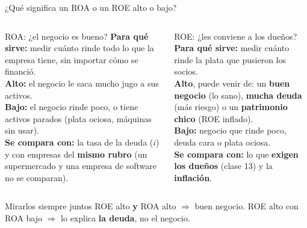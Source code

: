 \documentclass[aspectratio=169,10pt]{beamer}
\begin{document}
\begin{frame}{¿Qué significa un ROA o un ROE alto o bajo?}

\small
\begin{columns}[T]
\begin{block}{ROA: ¿el negocio es bueno?}
\textbf{Para qué sirve:} medir cuánto rinde todo lo que la empresa tiene, sin importar cómo se financió.\\[3pt]
\textbf{Alto:} el negocio le saca mucho jugo a sus activos.\\[3pt]
\textbf{Bajo:} el negocio rinde poco, o tiene activos parados (plata ociosa, máquinas sin usar).\\[3pt]
\textbf{Se compara con:} la tasa de la deuda ($i$) y con empresas del \textbf{mismo rubro}
(un supermercado y una empresa de software no se comparan).
\end{block}

\begin{block}{ROE: ¿les conviene a los dueños?}
\textbf{Para qué sirve:} medir cuánto rinde la plata que pusieron los socios.\\[3pt]
\textbf{Alto}, puede venir de: un \textbf{buen negocio} (lo sano), \textbf{mucha deuda} (más riesgo)
o un \textbf{patrimonio chico} (ROE inflado).\\[3pt]
\textbf{Bajo:} negocio que rinde poco, deuda cara o plata ociosa.\\[3pt]
\textbf{Se compara con:} lo que \textbf{exigen los dueños} (clase 13) y la \textbf{inflación}.
\end{block}
\end{columns}

\vspace{0.2cm}
\begin{alertblock}{Mirarlos siempre juntos}
ROE alto \textbf{y} ROA alto $\Rightarrow$ buen negocio. \quad
ROE alto con ROA bajo $\Rightarrow$ lo explica \textbf{la deuda}, no el negocio.
\end{alertblock}
\end{frame}
\end{document}
